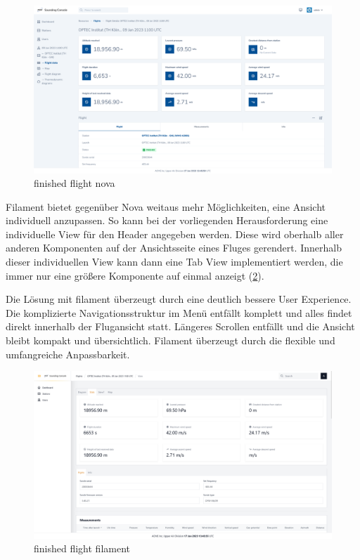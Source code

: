\begin{figure}[h!]
    \centering
    \caption{finished flight nova}
    \label{fig:finished_flight_nova}
    \includegraphics[scale=0.23]{assets/finished_flight_nova}
\end{figure}

Filament bietet gegenüber Nova weitaus mehr Möglichkeiten, eine Ansicht individuell anzupassen.
So kann bei der vorliegenden Herausforderung eine individuelle View für den Header angegeben werden.
Diese wird oberhalb aller anderen Komponenten auf der Ansichtsseite eines Fluges gerendert.
Innerhalb dieser individuellen View kann dann eine Tab View implementiert werden, die immer nur eine größere Komponente auf einmal anzeigt (\ref{fig:finished_flight_filament}).

Die Lösung mit filament überzeugt durch eine deutlich bessere User Experience.
Die komplizierte Navigationsstruktur im Menü entfällt komplett und alles findet direkt innerhalb der Flugansicht statt.
Längeres Scrollen entfällt und die Ansicht bleibt kompakt und übersichtlich.
Filament überzeugt durch die flexible und umfangreiche Anpassbarkeit.

\begin{figure}[h!]
    \centering
    \caption{finished flight filament}
    \label{fig:finished_flight_filament}
    \includegraphics[scale=0.23]{assets/finished_flight_filament}
\end{figure}

